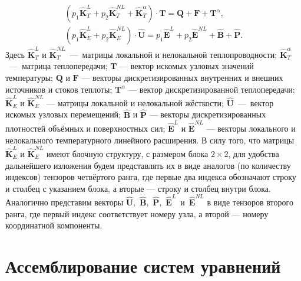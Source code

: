 \begin{gather}
	\label{eq:ThermalSLAE}
	\left( p_1 \widehat{\textbf{K}}^L_T + p_2 \widehat{\textbf{K}}^{NL}_T + \widehat{\textbf{K}}^{\alpha}_T \right) \cdot \textbf{T} = \textbf{Q} + \textbf{F} + \textbf{T}^{\alpha}, \\
	\label{eq:StressSLAE}
	\left( p_1 \widehat{\textbf{K}}^L_E + p_2 \widehat{\textbf{K}}^{NL}_E \right) \cdot \widehat{\textbf{U}} = p_1 \widehat{\textbf{E}}^L + p_2 \widehat{\textbf{E}}^{NL} + \widehat{\textbf{B}} + \widehat{\textbf{P}}.
\end{gather}
Здесь $\widehat{\textbf{K}}^L_T$ и $\widehat{\textbf{K}}^{NL}_T$~---~матрицы локальной и нелокальной теплопроводности;
$\widehat{\textbf{K}}^{\alpha}_T$~---~матрица теплопередачи;
$\textbf{T}$ --- вектор искомых узловых значений температуры;
$\textbf{Q}$ и $\textbf{F}$ --- векторы дискретизированных внутренних и внешних источников и стоков теплоты;
$\textbf{T}^{\alpha}$ --- вектор дискретизированной теплопередачи;
$\widehat{\textbf{K}}^L_E$ и $\widehat{\textbf{K}}^{NL}_E$ --- матрицы локальной и нелокальной жёсткости;
$\widehat{\textbf{U}}$~---~вектор искомых узловых перемещений;
$\widehat{\textbf{B}}$ и $\widehat{\textbf{P}}$ --- векторы дискретизированных плотностей объёмных и поверхностных сил;
$\widehat{\textbf{E}}^L$ и $\widehat{\textbf{E}}^{NL}$ --- векторы локального и нелокального температурного линейного расширения.
В силу того, что матрицы $\widehat{\textbf{K}}^L_E$ и $\widehat{\textbf{K}}^{NL}_E$ имеют блочную структуру, с размером блока $2 \times 2$, для удобства дальнейшего изложения будем представлять их в виде аналогов (по количеству индексов) тензоров четвёртого ранга, где первые два индекса обозначают строку и столбец с указанием блока, а вторые --- строку и столбец внутри блока.
Аналогично представим векторы \mbox{$\widehat{\textbf{U}}$, $\widehat{\textbf{B}}$, $\widehat{\textbf{P}}$, $\widehat{\textbf{E}}^L$ и $\widehat{\textbf{E}}^{NL}$} в виде тензоров второго ранга, где первый индекс соответствует номеру узла, а второй --- номеру координатной компоненты.

\section{Ассемблирование систем уравнений}\label{sec:NumericalMethods/SLAEAssembling}

